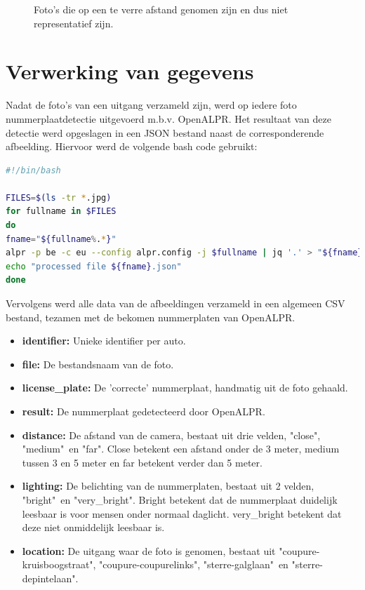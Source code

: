 \begin{figure}[h!]
\begin{subfigure}[b]{0.45\linewidth}
	\end{subfigure}
	\caption{Foto's die op een te verre afstand genomen zijn en dus niet representatief zijn.}
	\label{fig:onlyfar}
\end{figure}

\section{Verwerking van gegevens}

Nadat de foto's van een uitgang verzameld zijn, werd op iedere foto nummerplaatdetectie uitgevoerd m.b.v. OpenALPR. Het resultaat van deze detectie werd opgeslagen in een JSON bestand naast de corresponderende afbeelding. Hiervoor werd de volgende bash code gebruikt:

\begin{lstlisting}[language=Bash, breaklines=true]
#!/bin/bash

FILES=$(ls -tr *.jpg)
for fullname in $FILES
do
fname="${fullname%.*}"
alpr -p be -c eu --config alpr.config -j $fullname | jq '.' > "${fname}.json"
echo "processed file ${fname}.json" 
done
\end{lstlisting}

Vervolgens werd alle data van de afbeeldingen verzameld in een algemeen CSV bestand, tezamen met de bekomen nummerplaten van OpenALPR.
\begin{itemize}
	\item \textbf{identifier:} Unieke identifier per auto.
	\item \textbf{file:} De bestandsnaam van de foto.
	\item \textbf{license\_plate:} De 'correcte' nummerplaat, handmatig uit de foto gehaald.
	\item \textbf{result:} De nummerplaat gedetecteerd door OpenALPR.
	\item \textbf{distance:} De afstand van de camera, bestaat uit drie velden, "close", "medium"\ en "far". Close betekent een afstand onder de 3 meter, medium tussen 3 en 5 meter en far betekent verder dan 5 meter.
	\item \textbf{lighting:} De belichting van de nummerplaten, bestaat uit 2 velden, "bright"\ en "very\_bright". Bright betekent dat de nummerplaat duidelijk leesbaar is voor mensen onder normaal daglicht. very\_bright betekent dat deze niet onmiddelijk leesbaar is.
	\item \textbf{location:} De uitgang waar de foto is genomen, bestaat uit "coupure-kruisboogstraat", "coupure-coupurelinks", "sterre-galglaan"\ en "sterre-depintelaan".
\end{itemize}

